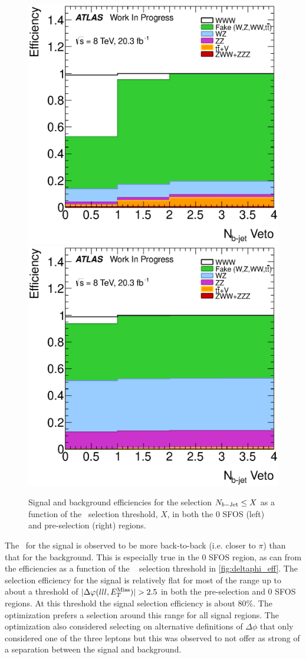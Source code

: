 \begin{figure}[ht!]
\centering
\includegraphics[width=0.45\columnwidth]{figures/optimization/SignalRegionsPreselection_0SFOS_Efficiencies/NBTaggedJets_LeftCumulative.eps}
\includegraphics[width=0.45\columnwidth]{figures/optimization/SignalRegions_0p5mmZ0_Preselection_Efficiencies/NBTaggedJets_LeftCumulative.eps}
\caption{ Signal and background efficiencies 
for the selection
$N_{b-\textrm{Jet}} \leq X$
as a function of the \nbjet~selection
threshold, $X$, in both the 0 SFOS (left) and pre-selection (right) regions.  }
\label{fig:nbjet_eff}
\end{figure}


The \deltaphi~for the signal is observed to be more back-to-back
(i.e. closer to $\pi$)
than that for the background. This is especially true in the 0 SFOS
region, as can from the efficiencies as a function of the \deltaphi~
selection threshold in \fig\ref{fig:deltaphi_eff}.
The selection efficiency for the signal is relatively flat for
most of the range up to about 
a threshold of $|\deltaphi|>2.5$ in both the pre-selection and 0 SFOS
regions.  At this threshold the signal selection efficiency 
is about 80\%.  The optimization prefers a selection
around this range for all signal regions.
The optimization also considered selecting on alternative
definitions of $\Delta\phi$ that only considered one of the three
leptons but this was observed to not offer as strong of a separation
between the signal and background. %

